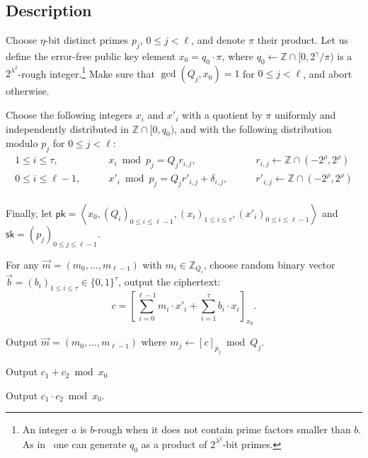 \documentclass[11pt]{llncs}
\renewcommand\leq\leqslant
\newcommand{\Z}{{\mathbb Z}}
\DeclareMathOperator{\KeyGen}{\ensuremath{\mathsf{KeyGen}}}
\DeclareMathOperator{\Encrypt}{\ensuremath{\mathsf{Encrypt}}}
\DeclareMathOperator{\Decrypt}{\ensuremath{\mathsf{Decrypt}}}
\DeclareMathOperator{\Add}{\ensuremath{\mathsf{Add}}}
\DeclareMathOperator{\Mult}{\ensuremath{\mathsf{Mult}}}
\newcommand*{\pk}{\ensuremath{\mathsf{pk}}}
\newcommand*{\sk}{\ensuremath{\mathsf{sk}}}
\newcommand*{\CDGHV}{\ensuremath{\mathsf{IDGHV}}}
\begin{document}
\subsection{Description}
\begin{description}\label{CDGHV}
\item[$\CDGHV.\KeyGen(1^\lambda,(Q_j)_{0\leq j <\ell})$.] Choose $\eta$-bit distinct primes $p_j$, $0\leq j<\ell$, and denote $\pi$
their product. Let us define the error-free public key element
$x_0=q_0\cdot\pi$, where $q_0 \gets \Z \cap [0,2^{\gamma}/\pi)$
  is a $2^{\lambda^2}$-rough integer.\footnote{An integer $a$ is $b$-rough when it does
    not contain prime factors smaller than $b$. As in~\cite{CMNT2011} one can
    generate $q_0$ as a product of $2^{\lambda^2}$-bit primes.}  
  Make sure that $\gcd(Q_j,x_0)=1$ for $0\leq j<\ell$, and abort otherwise.
  
  Choose the following integers $x_i$ and $x'_i$ with a quotient by $\pi$ uniformly
  and independently distributed in $\Z\cap [0, q_0)$, and with the
    following distribution modulo $p_j$ for $0 \leq j < \ell$:
$$
\begin{array}{lll}
1 \leq i \leq \tau, & \qquad x_i\bmod p_j = Q_j r_{i,j},& \qquad r_{i,j}
\gets\Z\cap(-2^{\rho}, 2^{\rho}) \\[.2cm]

0\leq i\leq \ell-1, & \qquad x'_i\bmod p_j = Q_jr'_{i,j}+\delta_{i,j}, &
\qquad r'_{i,j}\gets\Z\cap(-2^{\rho}, 2^{\rho}) \\[.2cm]

\end{array}
$$

Finally, let $\pk = \left\langle x_0, \left(Q_i\right)_{0\leq i \leq \ell-1},\left(x_i\right)_{1\leq i\leq \tau}, \left(x'_i\right)_{0\leq i\leq \ell-1}\right\rangle$ and $\sk=(p_j)_{0\leq j\leq {\ell-1}}$.
\\\vspace{-0.25cm}
\item[$\CDGHV.\Encrypt(\pk, {\vec{m}})$.] For any $\vec{m}=(m_0,\dots,m_{\ell-1})$ with $m_i\in\Z_{Q_i}$, choose random binary vector $\vec{b}=(b_i)_{1\leq i \leq \tau}\in \{0,1\}^\tau$, output the ciphertext:
\begin{equation}
\label{eq:enccdghv}
c = \left[\sum\limits_{i=0}^{\ell-1} m_i \cdot x'_i + 
	\sum_{i=1}^\tau 
b_i\cdot x_i\right]_{x_0}.
\end{equation}
\item[$\CDGHV.\Decrypt(\sk, c)$.] Output $\vec{m}=(m_0,\ldots,m_{\ell-1})$ where $m_j \gets [c]_{p_j} \bmod Q_j$.
\\\vspace{-0.25cm}
\item[$\CDGHV.\Add(\pk, c_1, c_2)$.] Output $c_1+c_2 \bmod x_0$
\\\vspace{-0.25cm}
\item[$\CDGHV.\Mult(\pk, c_1, c_2)$.] Output $c_1 \cdot c_2 \bmod x_0$.
\end{description}
\end{document}
